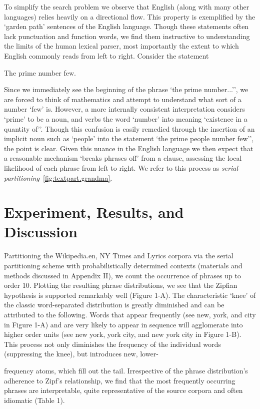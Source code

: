 To simplify the search problem we observe that English (along with
many other languages) relies heavily on a directional flow. This
property is exemplified by the `garden path' sentences of the English
language. Though these statements often lack punctuation and function
words, we find them instructive to understanding the limits of the
human lexical parser, most importantly the extent to which English
commonly reads from left to right. Consider the statement
\begin{center} 
  The prime number few.
\end{center} 
Since we immediately see the beginning of the phrase `the
prime number...'', we are forced to think of mathematics and attempt
to understand what sort of a number `few' is. However, a more
internally consistent interpretation considers `prime' to be a noun,
and verbs the word `number' into meaning `existence in a quantity
of''. Though this confusion is easily remedied through the insertion
of an implicit noun such as `people' into the statement `the prime
people number few'', the point is clear.  Given this nuance in the
English language we then expect that a reasonable mechanism `breaks
phrases off' from a clause, assessing the local likelihood of each
phrase from left to right. We refer to this process as \emph{serial
partitioning}~\ref{fig:textpart.grandma}.


\section{Experiment, Results, and Discussion}

Partitioning the Wikipedia.en, NY Times and Lyrics corpora via the
serial partitioning scheme with probabilistically determined contexts
(materials and methods discussed in Appendix II), we count the
occurrence of phrases up to order 10. Plotting the resulting phrase
distributions, we see that the Zipfian hypothesis is supported
remarkably well (Figure 1-A). The characteristic `knee' of the classic
word-separated distribution is greatly diminished and can be
attributed to the following. Words that appear frequently (see new,
york, and city in Figure 1-A) and are very likely to appear in
sequence will agglomerate into higher order units (see new york, york
city, and new york city in Figure 1-B). This process not only
diminishes the frequency of the individual words (suppressing the
knee), but introduces new, lower-


\noindent frequency atoms, which fill out the tail. Irrespective of
the phrase distribution's adherence to Zipf's relationship, we find
that the most frequently occurring phrases are interpretable, quite
representative of the source corpora and often idiomatic (Table 1).

